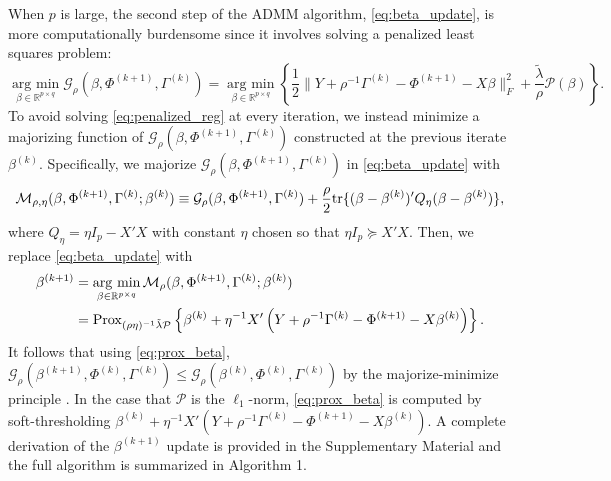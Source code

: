 \documentclass[12pt]{article}
\newcommand{\argmin}{\operatorname*{arg \ min}}
\begin{document}
When $p$ is large, the second step of the ADMM algorithm, \eqref{eq:beta_update}, is more computationally burdensome since it involves solving a penalized least squares problem: 
\begin{equation}\label{eq:penalized_reg}
\argmin_{\beta \in \mathbb{R}^{p \times q}} \mathcal{G}_{\rho}(\beta, \Phi^{(k+1)}, \Gamma^{(k)}) = \argmin_{\beta \in \mathbb{R}^{p \times q}} \left\{ \frac{1}{2}\|Y + \rho^{-1} \Gamma^{(k)} - \Phi^{(k+1)} - X\beta\|_F^2 +  \frac{\tilde{\lambda}}{\rho}\mathcal{P}(\beta)\right\}.
\end{equation}
To avoid solving \eqref{eq:penalized_reg} at every iteration, we instead minimize a majorizing function of $\mathcal{G}_{\rho}(\beta, \Phi^{(k+1)}, \Gamma^{(k)})$ constructed at the previous iterate $\beta^{(k)}.$ Specifically, we majorize $\mathcal{G}_{\rho}(\beta, \Phi^{(k+1)}, \Gamma^{(k)})$ in \eqref{eq:beta_update} with 
\vspace{-20pt}
\begin{equation}
\mathcal{M}_{\rho, \eta}(\beta, \Phi^{(k+1)}, \Gamma^{(k)}; \beta^{(k)}) \equiv \mathcal{G}_\rho(\beta, \Phi^{(k+1)}, \Gamma^{(k)}) + \frac{\rho}{2} {\rm tr}\{ (\beta - \beta^{(k)})'Q_\eta(\beta - \beta^{(k)})\},\notag
\end{equation}
where $Q_\eta = \eta I_p - X'X$ with constant $\eta$ chosen so that $\eta I_p \succeq X'X$. Then, we replace \eqref{eq:beta_update} with
\vspace{-20pt}
\begin{align}
\beta^{(k+1)} & =  \argmin_{\beta \in \mathbb{R}^{p \times q}} \mathcal{M}_{\rho}(\beta, \Phi^{(k+1)}, \Gamma^{(k)}; \beta^{(k)})\notag \\
& = {\rm Prox}_{(\rho \eta)^{-1}\tilde{\lambda} \mathcal{P}} \left\{ \beta^{(k)} + \eta^{-1} X'\left(Y + \rho^{-1} \Gamma^{(k)} - \Phi^{(k+1)} - X\beta^{(k)}\right)\right\} \label{eq:prox_beta}.
\end{align}
It follows that using  \eqref{eq:prox_beta}, $\mathcal{G}_{\rho}(\beta^{(k+1)}, \Phi^{(k)}, \Gamma^{(k)}) \leq \mathcal{G}_{\rho}(\beta^{(k)}, \Phi^{(k)}, \Gamma^{(k)})$ by the majorize-minimize principle \citep{lange2016mm}. In the case that $\mathcal{P}$ is the $\ell_1$-norm, \eqref{eq:prox_beta} is computed by soft-thresholding $\beta^{(k)} + \eta^{-1} X'(Y + \rho^{-1} \Gamma^{(k)} - \Phi^{(k+1)} - X\beta^{(k)})$. 
A complete derivation of the $\beta^{(k+1)}$ update is provided in the Supplementary Material and the full algorithm is summarized in Algorithm 1. 
\end{document}
